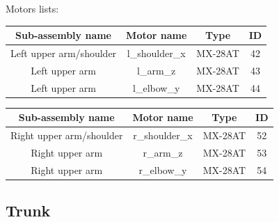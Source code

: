 \documentclass[includefoot]{article}
\begin{document}
Motors lists:

\begin{center}

\begin{tabular}{|c|c|c|c|}
\hline 
Sub-assembly name & Motor name & Type & ID \\ 
\hline 

Left upper arm/shoulder & l\_shoulder\_x & MX-28AT & 42 \\ 
\hline 
Left upper arm & l\_arm\_z & MX-28AT & 43 \\
\hline 
Left upper arm & l\_elbow\_y & MX-28AT & 44 \\
\hline 

\end{tabular} 
\end{center}

\begin{center}
\begin{tabular}{|c|c|c|c|}
\hline 
Sub-assembly name & Motor name & Type & ID \\ 
\hline 

Right upper arm/shoulder & r\_shoulder\_x & MX-28AT & 52 \\ 
\hline 
Right upper arm & r\_arm\_z & MX-28AT & 53 \\
\hline 
Right upper arm & r\_elbow\_y & MX-28AT & 54 \\
\hline 

\end{tabular} 
\end{center}


\subsection{Trunk} 
 
\end{document}
